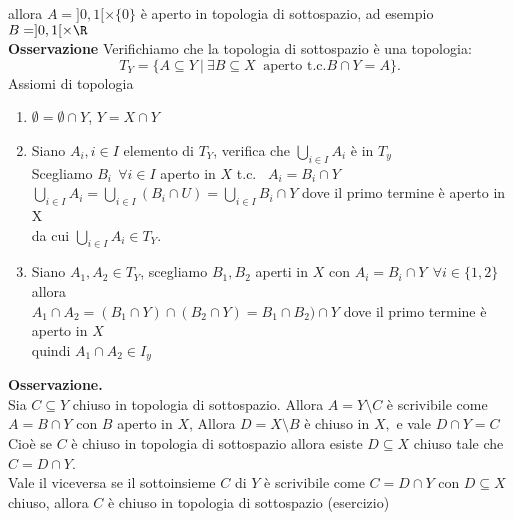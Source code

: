 \documentclass{article}
\begin{document}
\begin{center}
\end{center}
	   allora  $A = ]0,1[\times\{0\}$ è aperto in topologia di sottospazio, ad esempio  $B = ]0,1[\times\R$\\
	   \textbf{Osservazione} Verifichiamo che la topologia di sottospazio è una topologia:
	   \[
		   T_Y = \{A\subseteq Y \ | \ \exists B\subseteq X \ \text{ aperto t.c.}  B\cap Y = A\}
	   .\] 
	   Assiomi di topologia
	   \begin{enumerate}
		   \item $\emptyset = \emptyset \cap Y$,  $Y = X\cap Y$
		   \item Siano  $A_i, i\in I$ elemento di  $T_Y$, verifica che  $ \bigcup^{}_{i\in I}A_i$ è in $T_y$\\
			   Scegliamo  $B_i \ \ \forall i\in I$ aperto in  $X$ t.c. \ $ A_i = B_i\cap Y$\\
			    $ \bigcup^{}_{i\in I}A_i = \bigcup^{}_{i\in I}(B_i\cap U) = \bigcup^{}_{i\in I}B_i\cap Y$ dove il primo termine è aperto in X\\
			    da cui $  \bigcup^{}_{i\in I}A_i \in T_Y$.\\
		    \item Siano $A_1, A_2\in T_Y$, scegliamo $B_1,B_2$ aperti in $X$ con $A_i = B_i\cap Y \ \ \forall i\in \{1,2\}$ allora \\
			     $A_1\cap A_2 = (B_1\cap Y)\cap (B_2\cap Y) = B_1\cap B_2)\cap Y$ dove il primo termine è aperto in $X$\\
			     quindi $A_1\cap A_2\in I_y$\\
	   \end{enumerate}
			    \textbf{Osservazione.}\\
		 Sia $C\subseteq Y$ chiuso in topologia di sottospazio. Allora $A = Y\setminus C$ è scrivibile come $A = B\cap Y$ con $B$ aperto in $X$, Allora $D = X\setminus B$ è chiuso in $X, $ e vale $D \cap Y = C$\\
		 Cioè se  $C $ è chiuso in topologia di sottospazio allora esiste $D\subseteq X$ chiuso tale che  $C = D\cap Y$.\\
		 Vale il viceversa se il sottoinsieme  $C$ di $Y$ è scrivibile come  $C = D\cap Y$ con $D \subseteq X$ chiuso, allora  $C$ è chiuso in topologia di sottospazio (esercizio)
\end{document}
